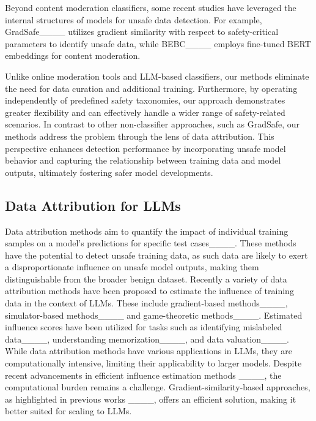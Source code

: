Beyond content moderation classifiers, some recent studies have leveraged the internal structures of models for unsafe data detection. For example, GradSafe____ utilizes gradient similarity with respect to safety-critical parameters to identify unsafe data, while BEBC____ employs fine-tuned BERT embeddings for content moderation.

Unlike online moderation tools and LLM-based classifiers, our methods eliminate the need for data curation and additional training. Furthermore, by operating independently of predefined safety taxonomies, our approach demonstrates greater flexibility and can effectively handle a wider range of safety-related scenarios. In contrast to other non-classifier approaches, such as GradSafe, our methods address the problem through the lens of data attribution. This perspective enhances detection performance by incorporating unsafe model behavior and capturing the relationship between training
data and model outputs, ultimately fostering safer model developments.

\subsection{Data Attribution for LLMs}

Data attribution methods aim to quantify the impact of individual training samples on a model's predictions for specific test cases____. These methods have the potential to detect unsafe training data, as such data are likely to exert a disproportionate influence on unsafe model outputs, making them distinguishable from the broader benign dataset. Recently a variety of data attribution methods have been proposed to estimate the influence of training data in the context of LLMs. These include gradient-based methods____, simulator-based methods____ and game-theoretic methods____.
Estimated influence scores have been utilized for tasks such as identifying mislabeled data____, understanding memorization____, and data valuation____. 
While data attribution methods have various applications in LLMs, they are computationally intensive, limiting their applicability to larger models. Despite recent advancements in efficient influence estimation methods ____, the computational burden remains a challenge. Gradient-similarity-based approaches, as highlighted in previous works ____, offers an efficient solution, making it better suited for scaling to LLMs.